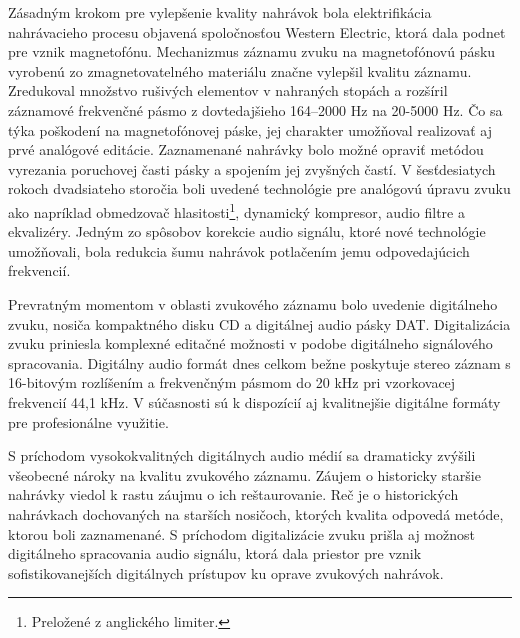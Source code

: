 Zásadným krokom pre vylepšenie kvality nahrávok bola elektrifikácia nahrávacieho procesu objavená spoločnosťou Western Electric, ktorá dala podnet pre vznik magnetofónu. Mechanizmus záznamu zvuku na magnetofónovú pásku vyrobenú zo zmagnetovatelného materiálu značne vylepšil kvalitu záznamu. Zredukoval množstvo rušivých elementov v nahraných stopách a rozšíril záznamové frekvenčné pásmo z dovtedajšieho 164–2000 Hz na 20-5000 Hz. Čo sa týka poškodení na magnetofónovej páske, jej charakter umožňoval realizovať aj prvé analógové editácie. Zaznamenané nahrávky bolo možné opraviť metódou vyrezania poruchovej časti pásky a spojením jej zvyšných častí. V šesťdesiatych rokoch dvadsiateho storočia boli uvedené technológie pre analógovú úpravu zvuku ako napríklad obmedzovač hlasitosti\footnote{Preložené z anglického limiter.}, dynamický kompresor, audio filtre a ekvalizéry. Jedným zo spôsobov korekcie audio signálu, ktoré nové technológie umožňovali, bola redukcia šumu nahrávok potlačením jemu odpovedajúcich frekvencií.

Prevratným momentom v oblasti zvukového záznamu bolo uvedenie digitálneho zvuku, nosiča kompaktného disku CD a digitálnej audio pásky DAT. Digitalizácia zvuku priniesla komplexné editačné možnosti v podobe digitálneho signálového spracovania. Digitálny audio formát dnes celkom bežne poskytuje stereo záznam s 16-bitovým rozlíšením a frekvenčným pásmom do 20 kHz pri vzorkovacej frekvencií 44,1 kHz. V súčasnosti sú k dispozícií aj kvalitnejšie digitálne formáty pre profesionálne využitie.

S príchodom vysokokvalitných digitálnych audio médií sa dramaticky zvýšili všeobecné nároky na kvalitu zvukového záznamu. Záujem o historicky staršie nahrávky viedol k rastu záujmu o ich reštaurovanie. Reč je o historických nahrávkach dochovaných na starších nosičoch, ktorých kvalita odpovedá metóde, ktorou boli zaznamenané. S príchodom digitalizácie zvuku prišla aj možnost digitálneho spracovania audio signálu, ktorá dala priestor pre vznik sofistikovanejších digitálnych prístupov ku oprave zvukových nahrávok.

